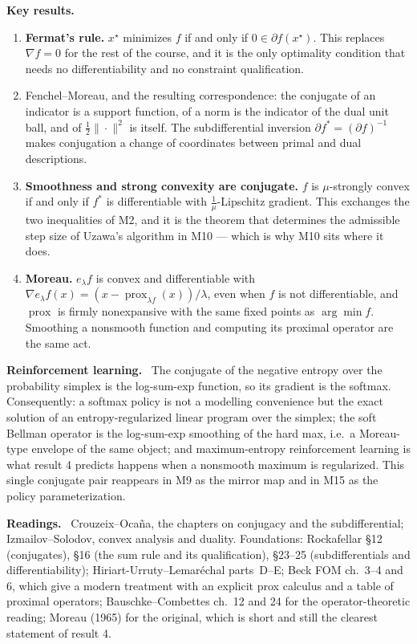 \documentclass[11pt,a4paper]{article}
\newcommand{\mpart}[1]{\smallskip\noindent\textbf{#1}\ \ignorespaces}
\newcommand{\prox}{\operatorname{prox}}
\begin{document}
\mpart{Key results.}
\begin{enumerate}
\item \textbf{Fermat's rule.} $x^\star$ minimizes $f$ if and only if $0 \in \partial f(x^\star)$.
This replaces $\nabla f = 0$ for the rest of the course, and it is the only optimality
condition that needs no differentiability and no constraint qualification.
\item Fenchel--Moreau, and the resulting correspondence: the conjugate of an indicator is a
support function, of a norm is the indicator of the dual unit ball, and of $\tfrac12\|\cdot\|^2$
is itself. The subdifferential inversion $\partial f^* = (\partial f)^{-1}$ makes conjugation
a change of coordinates between primal and dual descriptions.
\item \textbf{Smoothness and strong convexity are conjugate.} $f$ is $\mu$-strongly convex if
and only if $f^*$ is differentiable with $\tfrac1\mu$-Lipschitz gradient. This exchanges the
two inequalities of M2, and it is the theorem that determines the admissible step size of
Uzawa's algorithm in M10 --- which is why M10 sits where it does.
\item \textbf{Moreau.} $e_\lambda f$ is convex and differentiable with
$\nabla e_\lambda f(x)=(x-\prox_{\lambda f}(x))/\lambda$, even when $f$ is not
differentiable, and $\prox$ is firmly nonexpansive with the same fixed points as
$\arg\min f$. Smoothing a nonsmooth function and computing its proximal operator are the same
act.
\end{enumerate}

\mpart{Reinforcement learning.} The conjugate of the negative entropy over the probability
simplex is the log-sum-exp function, so its gradient is the softmax. Consequently: a softmax
policy is not a modelling convenience but the exact solution of an entropy-regularized linear
program over the simplex; the soft Bellman operator is the log-sum-exp smoothing of the hard
max, i.e.\ a Moreau-type envelope of the same object; and maximum-entropy reinforcement
learning is what result 4 predicts happens when a nonsmooth maximum is regularized. This
single conjugate pair reappears in M9 as the mirror map and in M15 as the policy
parameterization.

\mpart{Readings.} Crouzeix--Oca\~na, the chapters on conjugacy and the subdifferential;
Izmailov--Solodov, convex analysis and duality. Foundations: Rockafellar \S 12 (conjugates),
\S 16 (the sum rule and its qualification), \S 23--25 (subdifferentials and differentiability);
Hiriart-Urruty--Lemar\'echal parts~D--E; Beck FOM ch.~3--4 and 6, which give a modern
treatment with an explicit prox calculus and a table of proximal operators;
Bauschke--Combettes ch.~12 and 24 for the operator-theoretic reading; Moreau (1965) for the
original, which is short and still the clearest statement of result 4.
\end{document}
